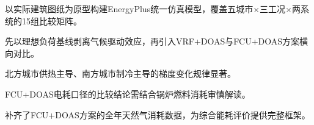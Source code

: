 \item 以实际建筑图纸为原型构建EnergyPlus统一仿真模型，覆盖五城市$\times$三工况$\times$两系统的15组比较矩阵。
\item 先以理想负荷基线剥离气候驱动效应，再引入VRF+DOAS与FCU+DOAS方案横向对比。
\item 北方城市供热主导、南方城市制冷主导的梯度变化规律显著。
\item FCU+DOAS电耗口径的比较结论需结合锅炉燃料消耗审慎解读。
\item 补齐了FCU+DOAS方案的全年天然气消耗数据，为综合能耗评价提供完整框架。

